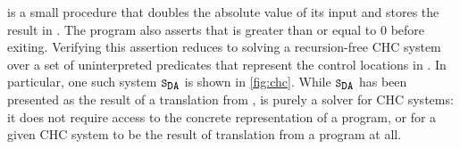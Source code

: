 \begin{figure}[t]
  \centering
  \begin{floatrow}[2]
    {
    }
  \end{floatrow}
\end{figure}
%
 is a small procedure that doubles the absolute value of
its input and stores the result in .
The program also asserts that  is greater than or equal to $0$
before exiting.
Verifying this assertion reduces to solving a recursion-free
CHC system over a set of uninterpreted predicates that represent
the control locations in .
%
In particular, one such system $\mcchc$ is shown in \autoref{fig:chc}.
%
%
While $\mcchc$ has been presented as the result
of a translation from , \sys is
purely a solver for CHC systems: it does not require access to the
concrete representation of a program, or for a given CHC system to be
the result of translation from a program at all.

